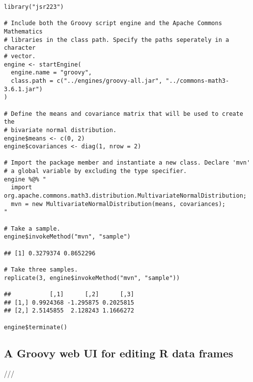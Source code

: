 \begin{verbatim}
library("jsr223")

# Include both the Groovy script engine and the Apache Commons Mathematics 
# libraries in the class path. Specify the paths seperately in a character
# vector.
engine <- startEngine(
  engine.name = "groovy",
  class.path = c("../engines/groovy-all.jar", "../commons-math3-3.6.1.jar")
)

# Define the means and covariance matrix that will be used to create the
# bivariate normal distribution.
engine$means <- c(0, 2)
engine$covariances <- diag(1, nrow = 2)

# Import the package member and instantiate a new class. Declare 'mvn'
# a global variable by excluding the type specifier.
engine %@% "
  import org.apache.commons.math3.distribution.MultivariateNormalDistribution;
  mvn = new MultivariateNormalDistribution(means, covariances);
"

# Take a sample.
engine$invokeMethod("mvn", "sample")

## [1] 0.3279374 0.8652296

# Take three samples.
replicate(3, engine$invokeMethod("mvn", "sample"))

##           [,1]      [,2]      [,3]
## [1,] 0.9924368 -1.295875 0.2025815
## [2,] 2.5145855  2.128243 1.1666272

engine$terminate()
\end{verbatim}

\subsection{A Groovy web UI for editing R data frames}

///




%
%
%
%
%

